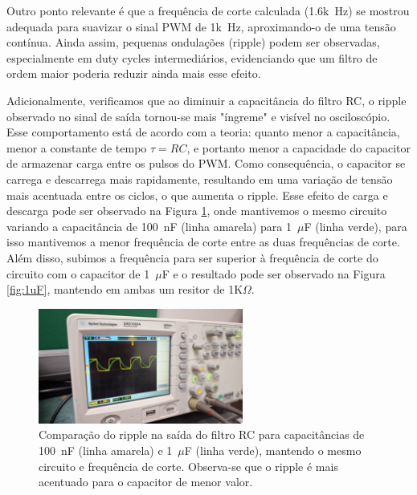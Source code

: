 \documentclass{article}
\begin{document}
Outro ponto relevante é que a frequência de corte calculada (1.6k~Hz) se mostrou adequada para suavizar o sinal PWM de 1k~Hz, aproximando-o de uma tensão contínua. Ainda assim, pequenas ondulações (ripple) podem ser observadas, especialmente em duty cycles intermediários, evidenciando que um filtro de ordem maior poderia reduzir ainda mais esse efeito.

Adicionalmente, verificamos que ao diminuir a capacitância do filtro RC, o ripple observado no sinal de saída tornou-se mais "íngreme" e visível no osciloscópio. Esse comportamento está de acordo com a teoria: quanto menor a capacitância, menor a constante de tempo $\tau = RC$, e portanto menor a capacidade do capacitor de armazenar carga entre os pulsos do PWM. Como consequência, o capacitor se carrega e descarrega mais rapidamente, resultando em uma variação de tensão mais acentuada entre os ciclos, o que aumenta o ripple. Esse efeito de carga e descarga pode ser observado na Figura \ref{fig:100nF_1uF}, onde mantivemos o mesmo circuito variando a capacitância de 100~nF (linha amarela) para 1~$\mu$F (linha verde), para isso mantivemos a menor frequência de corte entre as duas frequências de corte. Além disso, subimos a frequência para ser superior à frequência de corte do circuito com o capacitor de 1~$\mu$F e o resultado pode ser observado na Figura \ref{fig:1uF}, mantendo em ambas um resitor de 1K$\Omega$.



\begin{figure}[H]
    \centering
    \includegraphics[width=0.6\textwidth]{fig/100nF_1uF.jpeg}
    \caption{Comparação do ripple na saída do filtro RC para capacitâncias de 100~nF (linha amarela) e 1~$\mu$F (linha verde), mantendo o mesmo circuito e frequência de corte. Observa-se que o ripple é mais acentuado para o capacitor de menor valor.}
    \label{fig:100nF_1uF} 
\end{figure}
 
\end{document}
